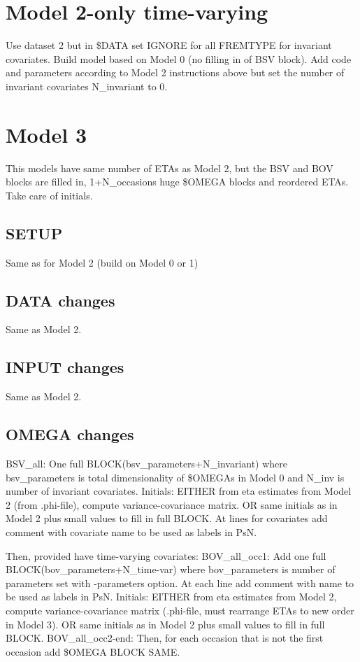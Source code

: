 \section{Model 2-only time-varying}
Use dataset 2 but in \$DATA set IGNORE for all FREMTYPE for invariant covariates. Build model based on Model 0 (no filling in of BSV block). Add code and parameters according to Model 2 instructions above but set the number of invariant covariates N\_invariant to 0.

\section{Model 3}

This models have same number of ETAs as Model 2, but the BSV and BOV blocks are filled in, 1+N\_occasions huge \$OMEGA blocks and reordered ETAs. Take care of initials.

\subsection{SETUP}
Same as for Model 2 (build on Model 0 or 1)

\subsection{DATA changes}
Same as Model 2.
\subsection{INPUT changes}
Same as Model 2.

\subsection{OMEGA changes}
BSV\_all: One full BLOCK(bsv\_parameters+N\_invariant) where bsv\_parameters is total dimensionality of \$OMEGAs in Model 0 and N\_inv is number of invariant covariates.
Initials: EITHER from eta estimates from Model 2 (from .phi-file), compute variance-covariance matrix. OR same initials as in Model 2 plus small values to fill in full BLOCK.
At lines for covariates add comment with covariate name to be used as labels in PsN.

Then, provided have time-varying covariates:
BOV\_all\_occ1: Add one full BLOCK(bov\_parameters+N\_time-var) where bov\_parameters is number of parameters set with -parameters option.
At each line add comment with name to be used as labels in PsN.
Initials: EITHER from eta estimates from Model 2, compute variance-covariance matrix (.phi-file, must rearrange ETAs to new order in Model 3). OR same initials as in Model 2 plus small values to fill in full BLOCK.
BOV\_all\_occ2-end: Then, for each occasion that is not the first occasion add \$OMEGA BLOCK SAME.

